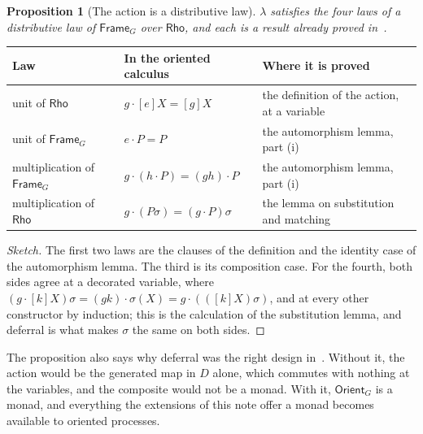 \documentclass[11pt]{article}
\theoremstyle{definition}
\theoremstyle{plain}
\newtheorem{proposition}[definition]{Proposition}
\theoremstyle{remark}
\begin{document}
\begin{proposition}[The action is a distributive law]
\label{prop:beck}
\(\lambda\) satisfies the four laws of a distributive law of
\(\mathsf{Frame}_G\) over \(\mathsf{Rho}\), and each is a result already proved
in~\cite{Oriented}.
\end{proposition}

\begin{center}
\small
\begin{tabular}{@{}L{0.22\textwidth}L{0.30\textwidth}L{0.38\textwidth}@{}}
\toprule
\textbf{Law} & \textbf{In the oriented calculus} & \textbf{Where it is proved} \\
\midrule
unit of \(\mathsf{Rho}\) & \(g\cdot[e]X = [g]X\) &
the definition of the action, at a variable \\[3pt]
unit of \(\mathsf{Frame}_G\) & \(e\cdot P = P\) &
the automorphism lemma, part (i) \\[3pt]
multiplication of \(\mathsf{Frame}_G\) & \(g\cdot(h\cdot P) = (gh)\cdot P\) &
the automorphism lemma, part (i) \\[3pt]
multiplication of \(\mathsf{Rho}\) & \(g\cdot(P\sigma) = (g\cdot P)\sigma\) &
the lemma on substitution and matching \\
\bottomrule
\end{tabular}
\end{center}

\begin{proof}[Sketch]
The first two laws are the clauses of the definition and the identity case of
the automorphism lemma. The third is its composition case. For the fourth,
both sides agree at a decorated variable, where
\((g\cdot[k]X)\sigma = (gk)\cdot\sigma(X) = g\cdot(([k]X)\sigma)\), and at every
other constructor by induction; this is the calculation of the substitution
lemma, and deferral is what makes \(\sigma\) the same on both sides.
\end{proof}

The proposition also says why deferral was the right design in~\cite{Oriented}.
Without it, the action would be the generated map in \(D\) alone, which commutes
with nothing at the variables, and the composite would not be a monad. With it,
\(\mathsf{Orient}_G\) is a monad, and everything the extensions of this note
offer a monad becomes available to oriented processes.
\end{document}
